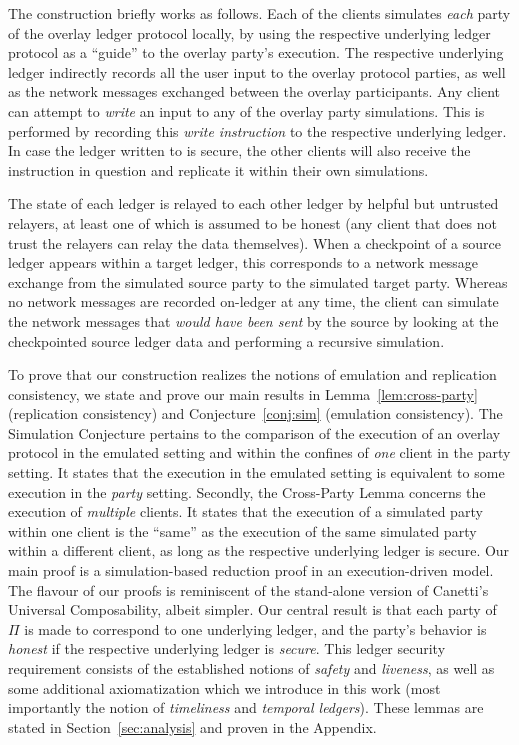 The construction briefly works as follows.
Each of the \rollerblade clients simulates \emph{each} party of the overlay
ledger protocol locally, by using the respective underlying ledger protocol
as a ``guide'' to the overlay party's execution.
The respective underlying ledger indirectly records all the
user input to the overlay protocol parties, as well as the network
messages exchanged between the overlay participants.
Any \rollerblade client can attempt to \emph{write} an input to any
of the overlay party simulations. This is performed by recording this
\emph{write instruction} to the respective underlying ledger. In case
the ledger written to is secure, the other \rollerblade clients will
also receive the instruction in question and replicate it within their
own simulations.

The
state of each ledger is relayed to each other ledger by helpful but
untrusted relayers, at least one of which is assumed to be honest
(any \rollerblade client that does not trust the relayers can relay
the data themselves). When a checkpoint of a source ledger
appears within a target ledger, this corresponds to a network message
exchange from the simulated source party to the simulated target party.
Whereas no network messages are recorded on-ledger at any time,
the \rollerblade client can simulate the network messages that
\emph{would have been sent} by the source by looking at the checkpointed
source ledger data and performing a recursive simulation.

To prove that our construction realizes the notions of emulation and replication consistency,
we state and prove our main results in Lemma~\ref{lem:cross-party} (replication consistency)
and Conjecture~\ref{conj:sim} (emulation consistency).
The Simulation Conjecture pertains to the comparison of the execution
of an overlay protocol in the emulated setting and within the confines of
\emph{one} \rollerblade client in the party setting.
It states that the execution in the emulated setting
is equivalent to some execution in the \emph{party} setting.
Secondly, the Cross-Party Lemma concerns the execution of \emph{multiple}
\rollerblade clients. It states that the execution of a simulated party
within one \rollerblade client is the ``same'' as the execution of the
same simulated party within a different \rollerblade client, as long
as the respective underlying ledger is secure.
Our main proof is a simulation-based
reduction proof in an execution-driven model. The flavour of our proofs is reminiscent of the
stand-alone version of Canetti's Universal Composability, albeit simpler. Our central result
is that each party of $\Pi$ is made to correspond to one underlying ledger, and the party's
behavior is \emph{honest} if the respective underlying ledger is \emph{secure}. This ledger
security requirement consists of the established notions of \emph{safety} and \emph{liveness},
as well as some additional axiomatization which we introduce in this work (most importantly
the notion of \emph{timeliness} and \emph{temporal ledgers}).
These lemmas are stated in Section~\ref{sec:analysis} and proven in the Appendix.

